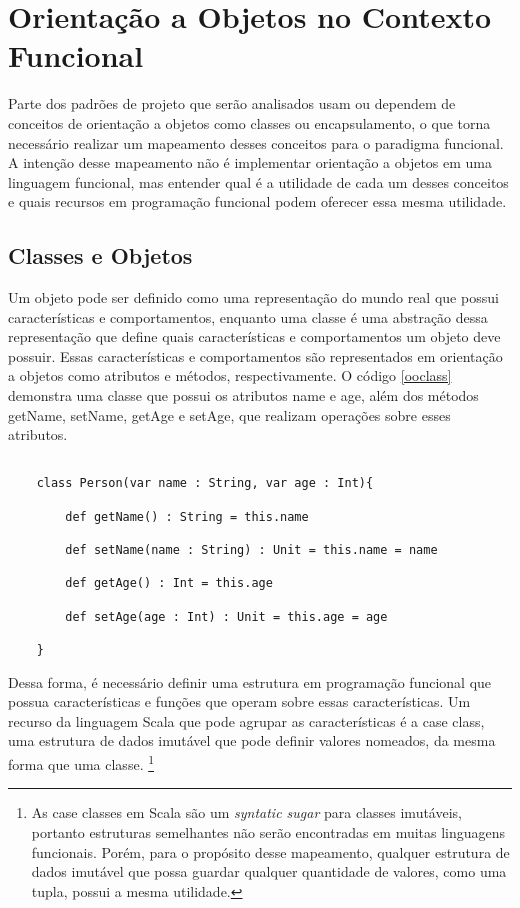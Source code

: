 
\chapter{Orientação a Objetos no Contexto Funcional}


Parte dos padrões de projeto que serão 
analisados usam ou dependem de conceitos 
de orientação a objetos como classes ou 
encapsulamento, o que torna necessário 
realizar um mapeamento desses conceitos 
para o paradigma funcional. A intenção 
desse mapeamento não é implementar 
orientação a objetos em uma linguagem 
funcional, mas entender qual é a utilidade 
de cada um desses conceitos e quais 
recursos em programação funcional podem 
oferecer essa mesma utilidade.


\section{Classes e Objetos}

Um objeto pode ser definido como uma representação 
do mundo real que possui características e comportamentos, 
enquanto uma classe é uma abstração dessa representação 
que define quais características e comportamentos um objeto 
deve possuir\cite{umlsystems}. Essas características 
e comportamentos são representados em orientação a 
objetos como atributos e métodos, respectivamente. 
O código \ref{ooclass} demonstra uma classe que 
possui os atributos name e age, além dos métodos 
getName, setName, getAge e setAge, que realizam 
operações sobre esses atributos.

\begin{lstlisting}[caption={Classe comum em Orientação a Objetos},label=ooclass]
    
    class Person(var name : String, var age : Int){

        def getName() : String = this.name

        def setName(name : String) : Unit = this.name = name

        def getAge() : Int = this.age

        def setAge(age : Int) : Unit = this.age = age

    }   

\end{lstlisting}

Dessa forma, é necessário definir uma estrutura em 
programação funcional que possua características e 
funções que operam sobre essas características. 
Um recurso da linguagem Scala que pode agrupar 
as características é a case class, uma estrutura de 
dados imutável que pode definir valores nomeados, 
da mesma forma que uma classe\cite{functionalscala}. 
\footnote{As case classes em Scala são um \textit{syntatic 
sugar} para classes imutáveis, portanto estruturas 
semelhantes não serão encontradas em muitas linguagens 
funcionais. Porém, para o propósito desse mapeamento, 
qualquer estrutura de dados imutável que possa guardar 
qualquer quantidade de valores, como uma tupla, possui a 
mesma utilidade.}

